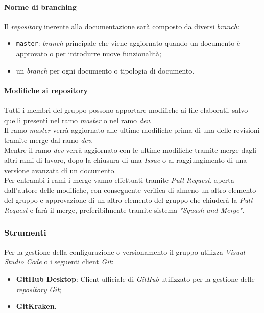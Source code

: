 		\paragraph*{Norme di branching}
		\aCapo{}  
			Il \emph{repository} inerente alla documentazione sarà composto da diversi \textit{branch}:
			\begin{itemize}
				\item \verb#master#: \emph{branch} principale che viene aggiornato quando un documento è approvato o per introdurre nuove funzionalità; 
				\item un \textit{branch} per ogni documento o tipologia di documento.
			\end{itemize}
		
		\paragraph*{Modifiche ai repository}
		\aCapo{}  
		Tutti i membri del gruppo possono apportare modifiche ai file elaborati, salvo quelli presenti nel ramo \textit{master} o nel ramo \textit{dev}. \\
		 Il ramo \textit{master} verrà aggiornato alle ultime modifiche prima di una delle revisioni tramite merge dal ramo \textit{dev}. \\
		Mentre il ramo \textit{dev} verrà aggiornato con le ultime modifiche tramite merge dagli altri rami di lavoro, dopo la chiusura di una \textit{Issue} o al raggiungimento di una versione avanzata di un documento. \\
		Per entrambi i rami i merge vanno effettuati tramite \textit{Pull Request}, aperta dall'autore delle modifiche, con conseguente verifica di almeno un altro elemento del gruppo e approvazione di un altro elemento del gruppo che chiuderà la \textit{Pull Request} e farà il merge, preferibilmente tramite sistema \textit{"Squash and Merge"}.
		
		\subsubsection{Strumenti}
			Per la gestione della configurazione o versionamento il gruppo utilizza \emph{Visual Studio Code} o i seguenti client \emph{Git}:
				
				\begin{itemize}
					\item \textbf{GitHub Desktop}: Client ufficiale di \emph{GitHub} utilizzato per la gestione delle \emph{repository} \emph{Git};
					\item \textbf{GitKraken}.
				\end{itemize}\
		
